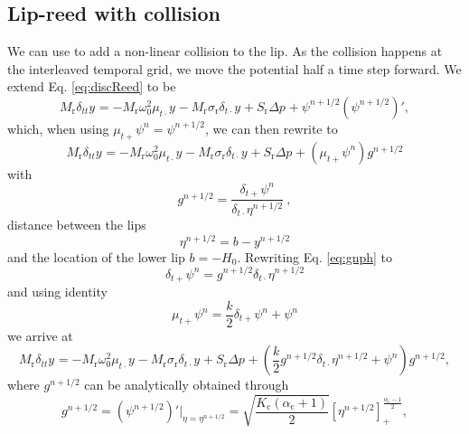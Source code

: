 \subsection{Lip-reed with collision}
\def\nph{}
\def\nphSys{n+1/2}
We can use  to add a non-linear collision to the lip. As the collision happens at the interleaved temporal grid, we move the potential half a time step forward. We extend Eq. \eqref{eq:discReed} to be
\begin{equation}
    M_\text{r}\delta_{tt}y^{\nph} = -M_\text{r}\omega_0^2\mu_{t\cdot}y^{\nph}-M_\text{r}\sigma_\text{r}\delta_{t\cdot}y^{\nph} + S_\text{r}\Delta p^{\nph} + \psi^{n+1/2}(\psi^{n+1/2})', 
\end{equation}
which, when using $\mu_{t+}\psi^n = \psi^{n+1/2}$, we can then rewrite to
\begin{equation}
    M_\text{r}\delta_{tt}y^{\nph} = -M_\text{r}\omega_0^2\mu_{t\cdot}y^{\nph}-M_\text{r}\sigma_\text{r}\delta_{t\cdot}y^{\nph} + S_\text{r}\Delta p^{\nph} + (\mu_{t+}\psi^n)g^{n+1/2} 
\end{equation}
with
\begin{equation}\label{eq:gnph}
    g^{n+1/2} = \frac{\delta_{t+}\psi^n}{\delta_{t\cdot}\eta^{n+1/2}}\ ,
\end{equation}
distance between the lips
\begin{equation}\label{eq:etaBarrier}
    \eta^{n+1/2} = b - y^{n+1/2}
\end{equation}
and the location of the lower lip $b = -H_0$. Rewriting Eq. \eqref{eq:gnph} to
\begin{equation}\label{eq:rewrittenPsi}
    \delta_{t+}\psi^n = g^{n+1/2}\delta_{t\cdot}\eta^{n+1/2}
\end{equation}
and using identity
\begin{equation}
    \mu_{t+}\psi^n = \frac{k}{2}\delta_{t+}\psi^n + \psi^n
\end{equation} 
we arrive at
\begin{equation}
    M_\text{r}\delta_{tt}y^{\nph} = -M_\text{r}\omega_0^2\mu_{t\cdot}y^{\nph}-M_\text{r}\sigma_\text{r}\delta_{t\cdot}y^{\nph} + S_\text{r}\Delta p^{\nph} + \left(\frac{k}{2}g^{n+1/2}\delta_{t\cdot}\eta^{n+1/2} + \psi^n\right)g^{n+1/2},
\end{equation}
where $g^{n+1/2}$ can be analytically obtained through 
\begin{equation}\label{eq:gAnalytic}
    g^{n+1/2} = (\psi^{n+1/2})'\bigg\rvert_{\eta = \eta^{n+1/2}} = \sqrt{\frac{K_\text{c}(\alpha_\text{c} + 1)}{2}}[\eta^{n+1/2}]_+^{\frac{\alpha_\text{c}-1}{2}},
\end{equation}

